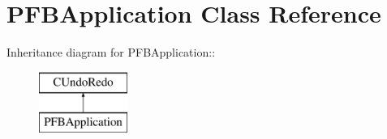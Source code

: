 \hypertarget{class_p_f_b_application}{
\section{PFBApplication Class Reference}
\label{class_p_f_b_application}
}
Inheritance diagram for PFBApplication::\begin{figure}[H]
\begin{center}
\leavevmode
\includegraphics[height=2cm]{class_p_f_b_application}
\end{center}
\end{figure}
